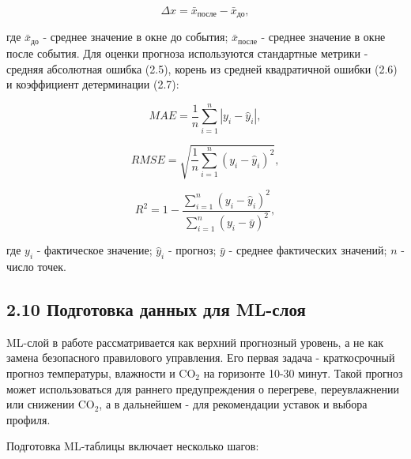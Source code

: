 \documentclass[a4paper,14pt]{extarticle}
\begin{document}
\begin{equation}
\Delta x = \bar{x}_{\text{после}} - \bar{x}_{\text{до}},
\tag{2.4}
\end{equation}

где \(\bar{x}_{\text{до}}\) - среднее значение в окне до события;
\(\bar{x}_{\text{после}}\) - среднее значение в окне после события. Для
оценки прогноза используются стандартные метрики - средняя абсолютная
ошибка (2.5), корень из средней квадратичной ошибки (2.6) и коэффициент
детерминации (2.7):

\begin{equation}
MAE = \frac{1}{n}\sum_{i=1}^{n}|y_i-\hat{y}_i|,
\tag{2.5}
\end{equation}

\begin{equation}
RMSE = \sqrt{\frac{1}{n}\sum_{i=1}^{n}(y_i-\hat{y}_i)^2},
\tag{2.6}
\end{equation}

\begin{equation}
R^2 = 1 - \frac{\sum_{i=1}^{n}(y_i-\hat{y}_i)^2}{\sum_{i=1}^{n}(y_i-\bar{y})^2},
\tag{2.7}
\end{equation}

где \(y_i\) - фактическое значение; \(\hat{y}_i\) - прогноз; \(\bar{y}\)
- среднее фактических значений; \(n\) - число точек.

\hypertarget{ux43fux43eux434ux433ux43eux442ux43eux432ux43aux430-ux434ux430ux43dux43dux44bux445-ux434ux43bux44f-ml-ux441ux43bux43eux44f}{%
\subsection{2.10 Подготовка данных для
ML-слоя}\label{ux43fux43eux434ux433ux43eux442ux43eux432ux43aux430-ux434ux430ux43dux43dux44bux445-ux434ux43bux44f-ml-ux441ux43bux43eux44f}}

ML-слой в работе рассматривается как верхний прогнозный уровень, а не
как замена безопасного правилового управления. Его первая задача -
краткосрочный прогноз температуры, влажности и CO\(_2\) на горизонте
10-30 минут. Такой прогноз может использоваться для раннего
предупреждения о перегреве, переувлажнении или снижении CO\(_2\), а в
дальнейшем - для рекомендации уставок и выбора профиля.

Подготовка ML-таблицы включает несколько шагов:
\end{document}
